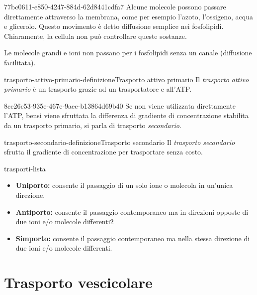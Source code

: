\documentclass[preview]{standalone}
\begin{document}
\begin{snippet}{77bc0611-e850-4247-884d-62d8441cdfa7}
    Alcune molecole possono passare direttamente attraverso la membrana, come per esempio l'azoto, l'ossigeno, acqua e glicerolo.
    Questo movimento è detto diffusione semplice nei fosfolipidi. Chiaramente, la cellula non può controllare queste sostanze.

    Le molecole grandi e ioni non passano per i fosfolipidi senza un canale (diffusione facilitata).

\end{snippet}

\begin{snippetdefinition}{trasporto-attivo-primario-definizione}{Trasporto attivo primario}
    Il \textit{trasporto attivo primario} è un trasporto grazie ad un trasportatore e all'ATP.
\end{snippetdefinition}

\begin{snippet}{8cc26c53-935e-467e-9aec-b13864d69b40}
    Se non viene utilizzata direttamente l'ATP,
    bensì viene sfruttata la differenza di gradiente di concentrazione stabilita da un trasporto primario,
    si parla di trasporto \textit{secondario}.
\end{snippet}

\begin{snippetdefinition}{trasporto-secondario-definizione}{Trasporto secondario}
    Il \textit{trasporto secondario} sfrutta il gradiente di concentrazione per trasportare
    senza costo.
\end{snippetdefinition}

\begin{snippet}{trasporti-lista}
    \begin{itemize}
        \item \textbf{Uniporto:} consente il passaggio di un solo ione o molecola in un'unica direzione.
        \item \textbf{Antiporto:} consente il passaggio contemporaneo ma in direzioni opposte di due ioni e/o molecole differenti2
        \item \textbf{Simporto:} consente il passaggio contemporaneo ma nella stessa direzione di due ioni e/o molecole differenti.
    \end{itemize}
\end{snippet}

\section{Trasporto vescicolare}
\end{document}

